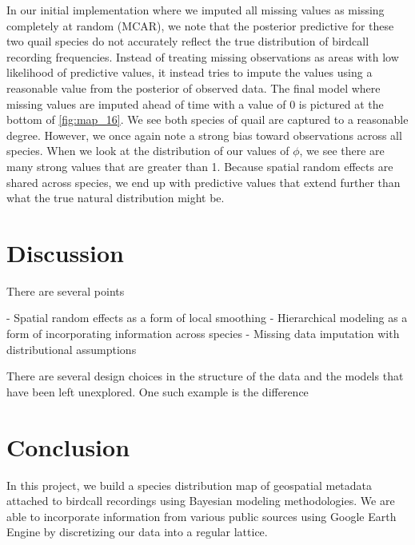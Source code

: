 \documentclass[notitlepage]{article}
\begin{document}
In our initial implementation where we imputed all missing values as missing completely at random (MCAR), we note that the posterior predictive for these two quail species do not accurately reflect the true distribution of birdcall recording frequencies.
Instead of treating missing observations as areas with low likelihood of predictive values, it instead tries to impute the values using a reasonable value from the posterior of observed data.
The final model where missing values are imputed ahead of time with a value of 0 is pictured at the bottom of \ref{fig:map_16}.
We see both species of quail are captured to a reasonable degree.
However, we once again note a strong bias toward observations across all species.
When we look at the distribution of our values of $\phi$, we see there are many strong values that are greater than 1.
Because spatial random effects are shared across species, we end up with predictive values that extend further than what the true natural distribution might be.


\section{Discussion}

There are several points 

- Spatial random effects as a form of local smoothing
- Hierarchical modeling as a form of incorporating information across species
- Missing data imputation with distributional assumptions

There are several design choices in the structure of the data and the models that have been left unexplored. One such example is the difference 

\section{Conclusion}

In this project, we build a species distribution map of geospatial metadata attached to birdcall recordings using Bayesian modeling methodologies.
We are able to incorporate information from various public sources using Google Earth Engine by discretizing our data into a regular lattice.



\printbibliography
\end{document}
